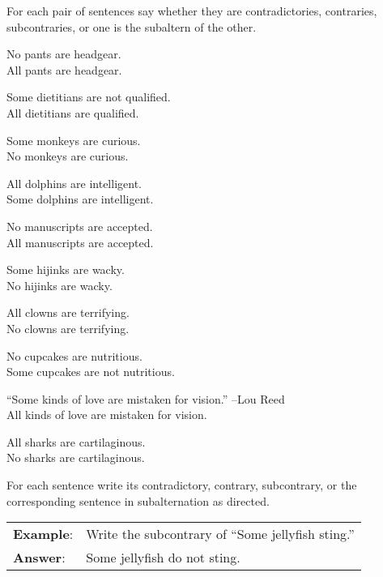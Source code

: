 \noindent \problempart For each pair of sentences say whether they are contradictories, contraries, subcontraries, or one is the subaltern of the other. 

\begin{exercises}
\item No pants are headgear. \\
	All pants are headgear.  
\item Some dietitians are not qualified. \\
	All dietitians are qualified.  
\item Some monkeys are curious. \\ 
	No monkeys are curious.  
\item All dolphins are intelligent. \\
	Some dolphins are intelligent.  
\item No manuscripts are accepted. \\
	All manuscripts are accepted. 
\item Some hijinks are wacky. \\ 
	No hijinks are wacky. 
\item All clowns are terrifying. \\
	No clowns are terrifying.  
\item No cupcakes are nutritious. \\
	Some cupcakes are not nutritious. 
\item ``Some kinds of love are mistaken for vision.'' --Lou Reed \\
	All kinds of love are mistaken for vision. 
\item All sharks are cartilaginous. \\
	No sharks are cartilaginous.
\end{exercises}

\noindent \problempart For each sentence write its contradictory, contrary, subcontrary, or the corresponding sentence in subalternation as directed.

\begin{longtabu}{p{.1\linewidth}p{.9\linewidth}}
\textbf{Example}: & Write the subcontrary of ``Some jellyfish sting.''\\
\textbf{Answer}: & Some jellyfish do not sting.\\
\end{longtabu}


